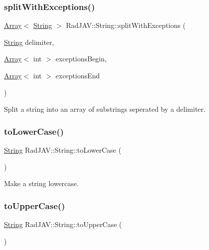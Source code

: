 \subsubsection{\texorpdfstring{split\+With\+Exceptions()}{splitWithExceptions()}}
{\footnotesize\ttfamily \mbox{\hyperlink{class_rad_j_a_v_1_1_array}{Array}}$<$ \mbox{\hyperlink{class_rad_j_a_v_1_1_string}{String}} $>$ Rad\+J\+A\+V\+::\+String\+::split\+With\+Exceptions (\begin{DoxyParamCaption}\item[{\mbox{\hyperlink{class_rad_j_a_v_1_1_string}{String}}}]{delimiter,  }\item[{\mbox{\hyperlink{class_rad_j_a_v_1_1_array}{Array}}$<$ int $>$}]{exceptions\+Begin,  }\item[{\mbox{\hyperlink{class_rad_j_a_v_1_1_array}{Array}}$<$ int $>$}]{exceptions\+End }\end{DoxyParamCaption})}



Split a string into an array of substrings seperated by a delimiter. 

\mbox{\label{class_rad_j_a_v_1_1_string_a7b680e0853e2e221a7728b224ef3f2fe}} 
\subsubsection{\texorpdfstring{to\+Lower\+Case()}{toLowerCase()}}
{\footnotesize\ttfamily \mbox{\hyperlink{class_rad_j_a_v_1_1_string}{String}} Rad\+J\+A\+V\+::\+String\+::to\+Lower\+Case (\begin{DoxyParamCaption}{ }\end{DoxyParamCaption})}



Make a string lowercase. 

\mbox{\label{class_rad_j_a_v_1_1_string_a02e8c3b12ea21ce39d861050ee02627a}} 
\subsubsection{\texorpdfstring{to\+Upper\+Case()}{toUpperCase()}}
{\footnotesize\ttfamily \mbox{\hyperlink{class_rad_j_a_v_1_1_string}{String}} Rad\+J\+A\+V\+::\+String\+::to\+Upper\+Case (\begin{DoxyParamCaption}{ }\end{DoxyParamCaption})}



